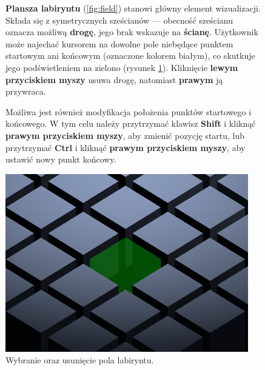 \documentclass[../doc.tex]{subfiles}
\begin{document}
\begin{figure}[H]
  \centering
  \begin{minipage}[c]{0.6\textwidth}
    \textbf{Plansza labiryntu} (\cref{fig:field}) stanowi główny element wizualizacji. Składa się z symetrycznych sześcianów — obecność sześcianu oznacza możliwą \textbf{drogę}, jego brak wskazuje na \textbf{ścianę}. Użytkownik może najechać kursorem na dowolne pole niebędące punktem startowym ani końcowym (oznaczone kolorem białym), co skutkuje jego podświetleniem na zielono (rysunek \ref{fig:cursor}). Kliknięcie \textbf{lewym przyciskiem myszy} usuwa drogę, natomiast \textbf{prawym} ją przywraca.

    Możliwa jest również modyfikacja położenia punktów startowego i końcowego. W tym celu należy przytrzymać klawisz \textbf{Shift} i kliknąć \textbf{prawym przyciskiem myszy}, aby zmienić pozycję startu, lub przytrzymać \textbf{Ctrl} i kliknąć \textbf{prawym przyciskiem myszy}, aby ustawić nowy punkt końcowy.

  \end{minipage}
  \hfill
  \begin{minipage}[c]{0.35\textwidth}
    \centering
    \includegraphics[width=\linewidth]{figures/cursor.png}
    \caption{\centering Wybranie oraz usunięcie pola labiryntu.}
    \label{fig:cursor}
  \end{minipage}
\end{figure}

\vspace{-9pt}
\end{document}
